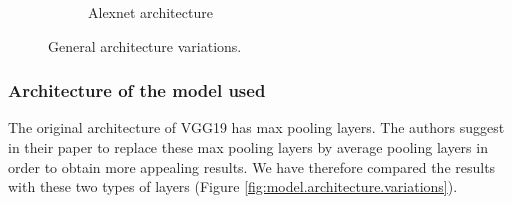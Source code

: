 \documentclass[twocolumn,superscriptaddress,aps,floatfix,nofootinbib]{revtex4-1}
\begin{document}
\begin{figure}[ht]
\begin{subfigure}[b]{0.22\textwidth}
            \caption{Alexnet architecture}
        \end{subfigure}
        \caption{General architecture variations.}
        \label{fig:arch.vars}
    \end{figure}
    
    \subsubsection{Architecture of the model used}
    
    The original architecture of VGG19 has max pooling layers. The authors suggest in their paper to replace these max pooling layers by average pooling layers in order to obtain more appealing results. We have therefore compared the results with these two types of layers (Figure \ref{fig:model.architecture.variations}).
    
\end{document}
